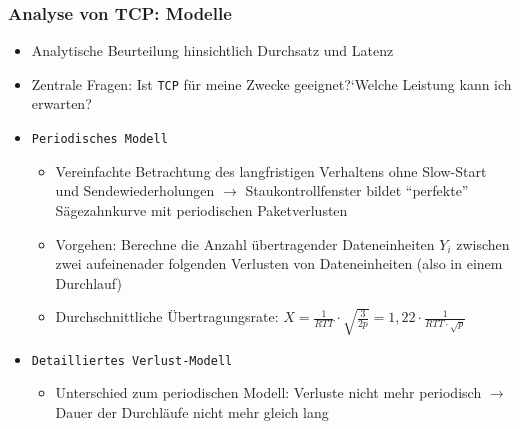 \subsubsection{Analyse von TCP: Modelle}
\begin{itemize}
	\item Analytische Beurteilung hinsichtlich Durchsatz und Latenz
	\item Zentrale Fragen: Ist \texttt{TCP} für meine Zwecke geeignet?`Welche Leistung kann ich erwarten?
	\item \texttt{Periodisches Modell}
	\begin{itemize}
		\item Vereinfachte Betrachtung des langfristigen Verhaltens ohne Slow-Start und Sendewiederholungen \(\rightarrow\) Staukontrollfenster bildet "`perfekte"' Sägezahnkurve mit periodischen Paketverlusten
		\item Vorgehen: Berechne die Anzahl übertragender Dateneinheiten \(Y_i\) zwischen zwei aufeinenader folgenden Verlusten von Dateneinheiten (also in einem Durchlauf)
		\item Durchschnittliche Übertragungsrate: \(X=\frac{1}{RTT}\cdot\sqrt{\frac{3}{2p}} = 1,22 \cdot \frac{1}{RTT\cdot\sqrt{p}}\)
	\end{itemize}
	\item \texttt{Detailliertes Verlust-Modell}
	\begin{itemize}
		\item Unterschied zum periodischen Modell: Verluste nicht mehr periodisch \(\rightarrow\) Dauer der Durchläufe nicht mehr gleich lang
	\end{itemize}
\end{itemize}



